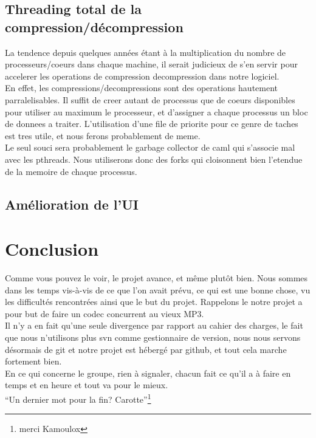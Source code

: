 \documentclass[a4paper,12pt]{article}
\begin{document}
	\subsection{Threading total de la compression/décompression}
La tendence depuis quelques ann\'ees \'etant \`a la multiplication du nombre de processeurs/coeurs dans chaque machine, il serait judicieux de s'en servir pour accelerer les operations de compression decompression dans notre logiciel.\\
En effet, les compressions/decompressions sont des operations hautement parralelisables. Il suffit de creer autant de processus que de coeurs disponibles pour utiliser au maximum le processeur, et d'assigner a chaque processus un bloc de donnees a traiter. L'utilisation d'une file de priorite pour ce genre de taches est tres utile, et nous ferons probablement de meme.\\
Le seul souci sera probablement le garbage collector de caml qui s'associe mal avec les pthreads. Nous utiliserons donc des forks qui cloisonnent bien l'etendue de la memoire de chaque processus.

	\subsection{Amélioration de l'UI}

\newpage

\section*{Conclusion}
Comme vous pouvez le voir, le projet avance, et même plutôt bien. Nous sommes
dans les temps vis-à-vis de ce que l'on avait prévu, ce qui est une bonne chose,
vu les difficultés rencontrées ainsi que le but du projet. Rappelons le notre
projet a pour but de faire un codec concurrent au vieux MP3.\\
Il n'y a en fait qu'une seule divergence par rapport au cahier des charges, le
fait que nous n'utilisons plus svn comme gestionnaire de version, nous nous
servons désormais de git et notre projet est hébergé par github, et tout cela
marche fortement bien.\\
En ce qui concerne le groupe, rien à signaler, chacun fait ce qu'il a à faire en
temps et en heure et tout va pour le mieux.\\
``Un dernier mot pour la fin? Carotte''\footnote{merci Kamoulox}\\

\newpage
\appendix
\end{document}
